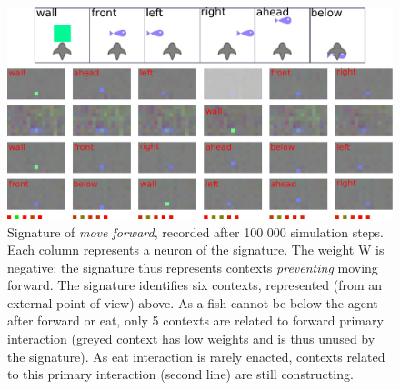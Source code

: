 \documentclass[conference]{IEEEtran}
\begin{document}
\begin{figure}[ht]
\centerline{\includegraphics[scale=0.32]{img/sig_forward.pdf}}
\caption{Signature of \textit{move forward}, recorded after 100 000 simulation steps. Each column represents a neuron of the signature. The weight W is negative: the signature thus represents contexts \textit{preventing} moving forward. The signature identifies six contexts, represented (from an external point of view) above. As a fish cannot be below the agent after forward or eat, only 5 contexts are related to forward primary interaction (greyed context has low weights and is thus unused by the signature). As eat interaction is rarely enacted, contexts related to this primary interaction (second line) are still constructing. %
}
\label{fig:forward}
\end{figure}




\end{document}
